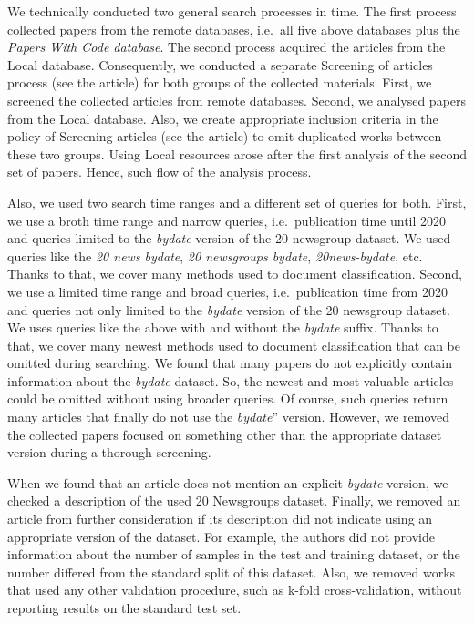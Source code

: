 \documentclass[
]{article}
\begin{document}
We technically conducted two general search processes in time. The first process collected papers from the remote databases, i.e.~all five above databases plus the \emph{Papers With Code database}. The second process acquired the articles from the Local database. Consequently, we conducted a separate Screening of articles process (see the article) for both groups of the collected materials. First, we screened the collected articles from remote databases. Second, we analysed papers from the Local database. Also, we create appropriate inclusion criteria in the policy of Screening articles (see the article) to omit duplicated works between these two groups. Using Local resources arose after the first analysis of the second set of papers. Hence, such flow of the analysis process.

Also, we used two search time ranges and a different set of queries for both. First, we use a broth time range and narrow queries, i.e.~publication time until 2020 and queries limited to the \emph{bydate} version of the 20 newsgroup dataset. We used queries like the \emph{20 news bydate}, \emph{20 newsgroups bydate}, \emph{20news-bydate}, etc. Thanks to that, we cover many methods used to document classification. Second, we use a limited time range and broad queries, i.e.~publication time from 2020 and queries not only limited to the \emph{bydate} version of the 20 newsgroup dataset. We uses queries like the above with and without the \emph{bydate} suffix. Thanks to that, we cover many newest methods used to document classification that can be omitted during searching. We found that many papers do not explicitly contain information about the \emph{bydate} dataset. So, the newest and most valuable articles could be omitted without using broader queries. Of course, such queries return many articles that finally do not use the \emph{bydate}'' version. However, we removed the collected papers focused on something other than the appropriate dataset version during a thorough screening.

When we found that an article does not mention an explicit \emph{bydate} version, we checked a description of the used 20 Newsgroups dataset. Finally, we removed an article from further consideration if its description did not indicate using an appropriate version of the dataset. For example, the authors did not provide information about the number of samples in the test and training dataset, or the number differed from the standard split of this dataset. Also, we removed works that used any other validation procedure, such as k-fold cross-validation, without reporting results on the standard test set.
\end{document}
